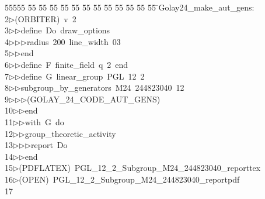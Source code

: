 %
%
\begin{tabbing}
55555 \= 55 \= 55 \= 55 \= 55 \= 55 \= 55 \= 55 \= 55 \= 55 \= 55 \= 55 \= 55 \= \>Golay24\_make\_aut\_gens:\\[0pt]
2\>$\triangleright$\>(ORBITER)\ v\ 2\ \\[0pt]
3\>$\triangleright$\>$\triangleright$\>define\ Do\ draw\_options\ \\[0pt]
4\>$\triangleright$\>$\triangleright$\>$\triangleright$\>radius\ 200\ line\_width\ 03\ \\[0pt]
5\>$\triangleright$\>$\triangleright$\>end\ \\[0pt]
6\>$\triangleright$\>$\triangleright$\>define\ F\ finite\_field\ q\ 2\ end\ \\[0pt]
7\>$\triangleright$\>$\triangleright$\>define\ G\ linear\_group\ PGL\ 12\ 2\ \\[0pt]
8\>$\triangleright$\>$\triangleright$\>subgroup\_by\_generators\ M24\ 244823040\ 12\ \\[0pt]
9\>$\triangleright$\>$\triangleright$\>$\triangleright$\>(GOLAY\_24\_CODE\_AUT\_GENS)\ \\[0pt]
10\>$\triangleright$\>$\triangleright$\>end\ \\[0pt]
11\>$\triangleright$\>$\triangleright$\>with\ G\ do\ \\[0pt]
12\>$\triangleright$\>$\triangleright$\>group\_theoretic\_activity\ \\[0pt]
13\>$\triangleright$\>$\triangleright$\>$\triangleright$\>report\ Do\ \\[0pt]
14\>$\triangleright$\>$\triangleright$\>end\\[0pt]
15\>$\triangleright$\>(PDFLATEX)\ PGL\_12\_2\_Subgroup\_M24\_244823040\_reporttex\\[0pt]
16\>$\triangleright$\>(OPEN)\ PGL\_12\_2\_Subgroup\_M24\_244823040\_reportpdf\\[0pt]
17\>\end{tabbing}
